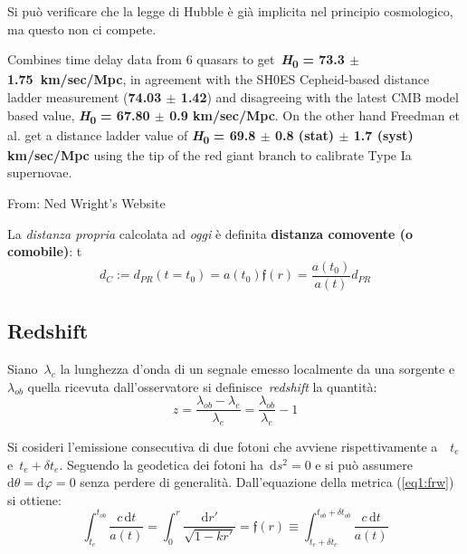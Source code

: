 Si può verificare che la legge di Hubble è già implicita nel principio
cosmologico, ma questo non ci compete.


\begin{definition}[Wong et al., 2019]
Combines time delay data from 6 
quasars to get~\textbf{\textit{H}}\textsubscript{\textbf{0}} \textbf{= 73.3 $\pm$
1.75{~}km/sec/Mpc}, in agreement with the SH0ES Cepheid-based distance
ladder measurement (\textbf{74.03 $\pm$ 1.42}) and disagreeing with the
latest CMB model based value, \textbf{\textit{H}}\textsubscript{\textbf{0}}
\textbf{= 67.80 $\pm$ 0.9 km/sec/Mpc}. On the other hand Freedman et al. get
a distance ladder value of \textbf{\textit{H}}\textsubscript{\textbf{0}}
\textbf{= 69.8 $\pm$ 0.8 (stat) $\pm$ 1.7 (syst) km/sec/Mpc} using the tip of
the red giant branch to calibrate Type Ia supernovae.
\vspace*{0.5em}

From: Ned Wright's Website
\end{definition}

La \emph{distanza propria} calcolata ad \emph{oggi} è definita
\textbf{distanza comovente (o comobile)}:
t\begin{equation}
d_{C}:=d_{PR}(t=t_0)=a(t_0)\mathfrak{f}(r)=\frac{a(t_0)}{a(t)}d_{PR}
\end{equation}

\subsection{Redshift}

Siano~\(\lambda_e\) la lunghezza d'onda di un segnale emesso
localmente da una sorgente e~\(\lambda_{ob}\) quella ricevuta
dall'osservatore si definisce~\emph{redshift} la quantità:
\begin{equation}
z=\frac{\lambda_{ob}-\lambda_e}{\lambda_e}=\frac{\lambda_{ob}}{\lambda_e}-1
\end{equation}

Si cosideri l'emissione consecutiva di due fotoni che avviene rispettivamente a~~\(t_e\)
e~\(t_e+\delta t_e\). Seguendo la geodetica dei fotoni
ha~\(\mathrm{d}s^2=0\) e si può assumere~\(\mathrm{d}\theta=\mathrm{d}\varphi=0\) senza perdere
di generalità. Dall'equazione della metrica (\ref{eq1:frw}) si ottiene:
\begin{equation}
\int_{t_{e}}^{t_{ob}}\frac{c\,\mathrm{d}t}{a(t)}=\int_{0}^{r}\frac{\mathrm{d}r'}{\sqrt{1-kr'}}=\mathfrak{f}(r)\equiv \int_{t_{e}+\delta t_e}^{t_{ob}+\delta t_{ob}}\frac{c\,\mathrm{d}t}{a(t)}
\end{equation}

